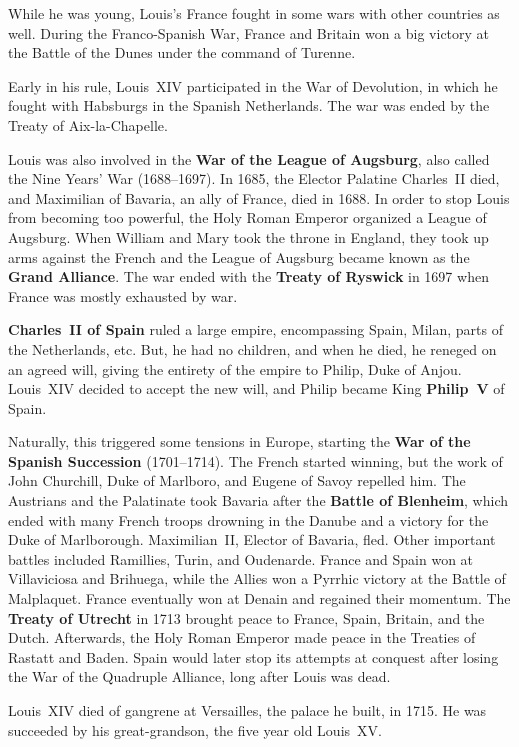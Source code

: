 While he was young, Louis's France fought in some wars with other countries as well.
During the Franco-Spanish War,
France and Britain won a big victory at the Battle of the Dunes under the command of Turenne.

Early in his rule, Louis~XIV participated in the War of Devolution,
in which he fought with Habsburgs in the Spanish Netherlands.
The war was ended by the Treaty of Aix-la-Chapelle.

Louis was also involved in the \textbf{War of the League of Augsburg},
also called the Nine Years' War (1688--1697).
In 1685, the Elector Palatine Charles~II died,
and Maximilian of Bavaria, an ally of France, died in 1688.
In order to stop Louis from becoming too powerful,
the Holy Roman Emperor organized a League of Augsburg.
When William and Mary took the throne in England,
they took up arms against the French
and the League of Augsburg became known as the \textbf{Grand Alliance}.
The war ended with the \textbf{Treaty of Ryswick} in 1697
when France was mostly exhausted by war.

\textbf{Charles~II of Spain} ruled a large empire,
encompassing Spain, Milan, parts of the Netherlands, etc.
But, he had no children, and when he died, he reneged on an agreed will,
giving the entirety of the empire to Philip, Duke of Anjou.
Louis~XIV decided to accept the new will, and Philip became King \textbf{Philip~V} of Spain.

Naturally, this triggered some tensions in Europe,
starting the \textbf{War of the Spanish Succession} (1701--1714).
The French started winning,
but the work of John Churchill, Duke of Marlboro, and Eugene of Savoy repelled him.
The Austrians and the Palatinate took Bavaria after the \textbf{Battle of Blenheim},
which ended with many French troops drowning in the Danube
and a victory for the Duke of Marlborough.
Maximilian~II, Elector of Bavaria, fled.
Other important battles included Ramillies, Turin, and Oudenarde.
France and Spain won at Villaviciosa and Brihuega,
while the Allies won a Pyrrhic victory at the Battle of Malplaquet.
France eventually won at Denain and regained their momentum.
The \textbf{Treaty of Utrecht} in 1713 brought peace to France, Spain, Britain, and the Dutch.
Afterwards, the Holy Roman Emperor made peace in the Treaties of Rastatt and Baden.
Spain would later stop its attempts at conquest after losing the War of the Quadruple Alliance,
long after Louis was dead.

Louis~XIV died of gangrene at Versailles, the palace he built, in 1715.
He was succeeded by his great-grandson, the five year old Louis~XV\@.

